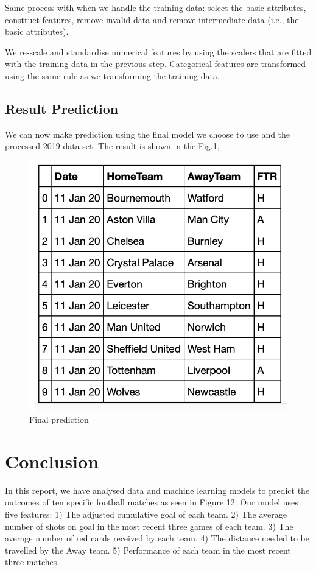 \documentclass{article}
\begin{document}
Same process with when we handle the training data: select the basic attributes, construct features, remove invalid data and remove intermediate data (i.e., the basic attributes).

We re-scale and standardise numerical features by using the scalers that are fitted with the training data in the previous step. Categorical features are transformed using the same rule as we transforming the training data.

\subsection{Result Prediction}
We can now make prediction using the final model we choose to use and the processed 2019 data set. The result is shown in the Fig.\ref{fig:finalPrediction},
\begin{figure}[ht]
\centering
\includegraphics[scale=0.5]{graphs/finalPrediction.png}
\caption{Final prediction}
\label{fig:finalPrediction}
\end{figure}

\section{Conclusion}
In this report, we have analysed data and machine learning models to predict the outcomes of ten specific football matches as seen in Figure 12.  Our model uses five features: 
1) The adjusted cumulative goal of each team.
2) The average number of shots on goal in the most recent three games of each team.
3) The average number of red cards received by each team. 
4) The distance needed to be travelled by the Away team.
5) Performance of each team in the most recent three matches.
\end{document}
